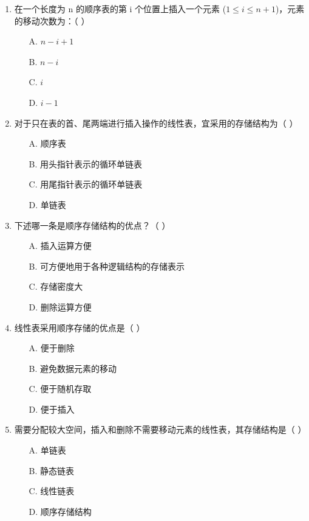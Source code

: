 \documentclass[12pt, a4paper]{article}
\begin{document}
\begin{enumerate}[label=\arabic*.]
	\item 在一个长度为 n 的顺序表的第 i 个位置上插入一个元素 ($1 \le i \le n+1$)，元素的移动次数为：（ ）
	      \begin{enumerate}
		      \item[A.] $n-i+1$
		      \item[B.] $n-i$
		      \item[C.] $i$
		      \item[D.] $i-1$
	      \end{enumerate}

	\item 对于只在表的首、尾两端进行插入操作的线性表，宜采用的存储结构为（ ）
	      \begin{enumerate}
		      \item[A.] 顺序表
		      \item[B.] 用头指针表示的循环单链表
		      \item[C.] 用尾指针表示的循环单链表
		      \item[D.] 单链表
	      \end{enumerate}

	\item 下述哪一条是顺序存储结构的优点？（ ）
	      \begin{enumerate}
		      \item[A.] 插入运算方便
		      \item[B.] 可方便地用于各种逻辑结构的存储表示
		      \item[C.] 存储密度大
		      \item[D.] 删除运算方便
	      \end{enumerate}

	\item 线性表采用顺序存储的优点是（ ）
	      \begin{enumerate}
		      \item[A.] 便于删除
		      \item[B.] 避免数据元素的移动
		      \item[C.] 便于随机存取
		      \item[D.] 便于插入
	      \end{enumerate}

	\item 需要分配较大空间，插入和删除不需要移动元素的线性表，其存储结构是（ ）
	      \begin{enumerate}
		      \item[A.] 单链表
		      \item[B.] 静态链表
		      \item[C.] 线性链表
		      \item[D.] 顺序存储结构
	      \end{enumerate}


\end{enumerate}
\end{document}
